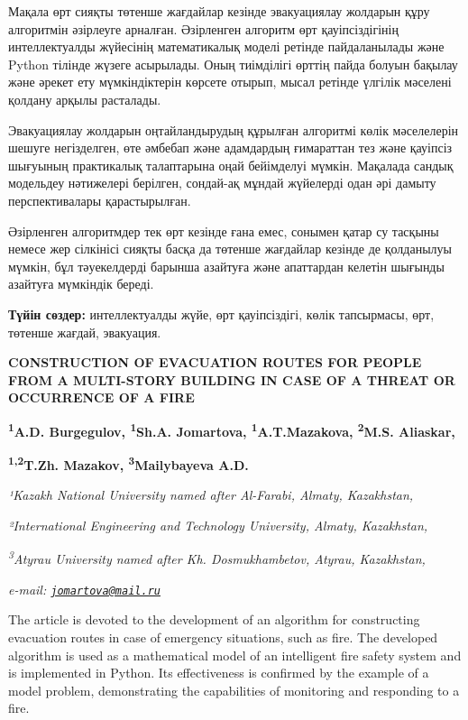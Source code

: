 Мақала өрт сияқты төтенше жағдайлар кезінде эвакуациялау жолдарын құру
алгоритмін әзірлеуге арналған. Әзірленген алгоритм өрт қауіпсіздігінің
интеллектуалды жүйесінің математикалық моделі ретінде пайдаланылады және
Python тілінде жүзеге асырылады. Оның тиімділігі өрттің пайда болуын
бақылау және әрекет ету мүмкіндіктерін көрсете отырып, мысал ретінде
үлгілік мәселені қолдану арқылы расталады.

Эвакуациялау жолдарын оңтайландырудың құрылған алгоритмі көлік
мәселелерін шешуге негізделген, өте әмбебап және адамдардың ғимараттан
тез және қауіпсіз шығуының практикалық талаптарына оңай бейімделуі
мүмкін. Мақалада сандық модельдеу нәтижелері берілген, сондай-ақ мұндай
жүйелерді одан әрі дамыту перспективалары қарастырылған.

Әзірленген алгоритмдер тек өрт кезінде ғана емес, сонымен қатар су
тасқыны немесе жер сілкінісі сияқты басқа да төтенше жағдайлар кезінде
де қолданылуы мүмкін, бұл тәуекелдерді барынша азайтуға және апаттардан
келетін шығынды азайтуға мүмкіндік береді.

{\bfseries Түйін сөздер:} интеллектуалды жүйе, өрт қауіпсіздігі, көлік
тапсырмасы, өрт, төтенше жағдай, эвакуация.

{\bfseries CONSTRUCTION OF EVACUATION ROUTES FOR PEOPLE FROM A MULTI-STORY
BUILDING IN CASE OF A THREAT OR OCCURRENCE OF A FIRE}

{\bfseries \textsuperscript{1}A.D. Burgegulov, \textsuperscript{1}Sh.A.
Jomartova\textsuperscript{\envelope }, \textsuperscript{1}A.T.Mazakova,
\textsuperscript{2}M.S. Aliaskar,}

{\bfseries \textsuperscript{1,2}T.Zh. Mazakov,
\textsuperscript{3}Mailybayeva A.D.}

\emph{¹Kazakh National University named after Al-Farabi, Almaty,
Kazakhstan,}

\emph{²International Engineering and Technology University, Almaty,
Kazakhstan,}

\emph{\textsuperscript{3}Atyrau University named after Kh.
Dosmukhambetov, Atyrau, Kazakhstan,}

\emph{e-mail:
\href{mailto:jomartova@mail.ru}{\nolinkurl{jomartova@mail.ru}}}

The article is devoted to the development of an algorithm for
constructing evacuation routes in case of emergency situations, such as
fire. The developed algorithm is used as a mathematical model of an
intelligent fire safety system and is implemented in Python. Its
effectiveness is confirmed by the example of a model problem,
demonstrating the capabilities of monitoring and responding to a fire.

